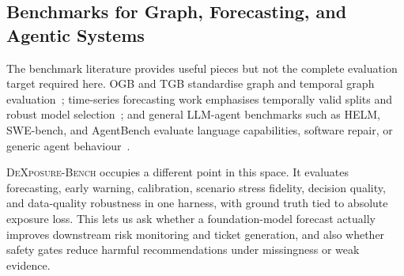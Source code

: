 \subsection{Benchmarks for Graph, Forecasting, and Agentic Systems}

The benchmark literature provides useful pieces but not the complete
evaluation target required here. OGB and TGB standardise graph and temporal
graph evaluation~\cite{hu2020ogb,huang2023tgb}; time-series forecasting work
emphasises temporally valid splits and robust model selection~\cite{
BergmeirBenitez2012CVTS}; and general LLM-agent benchmarks such as HELM,
SWE-bench, and AgentBench evaluate language capabilities, software repair, or
generic agent behaviour~\cite{liang2022helm,jimenez2024swebench,
liu2024agentbench}.

\textsc{DeXposure-Bench} occupies a different point in this space. It evaluates
forecasting, early warning, calibration, scenario stress fidelity, decision
quality, and data-quality robustness in one harness, with ground truth tied to
absolute exposure loss. This lets us ask whether a foundation-model forecast
actually improves downstream risk monitoring and ticket generation, and also
whether safety gates reduce harmful recommendations under missingness or weak
evidence.
